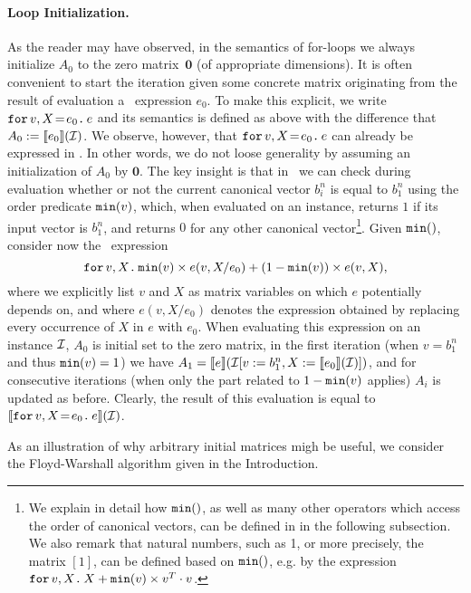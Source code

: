 \paragraph{Loop Initialization.} As the reader may have observed, in the semantics of for-loops we 
always initialize $A_0$ to the zero matrix~$\mathbf{0}$ (of appropriate dimensions). It is often convenient
to start the iteration given some concrete matrix  originating from the result of evaluation a \langfor\ expression $e_0$. To make this explicit, we write $\initf{e_0}{v}{X}{e}$ and its semantics is defined as above
with the difference that $A_0:=\sem{e_0}{\I}$. We observe, however, that $\initf{e_0}{v}{X}{e}$ can already
be expressed in \langfor. In other words, we do not loose generality by assuming an initialization of $A_0$ by $\mathbf{0}$.
The key insight is that in \langfor\ we can check during evaluation whether or not
the current canonical vector $b_i^n$ is equal to $b_1^n$ using the order predicate $\mmin{v}$, which, when evaluated on an instance, returns $1$ if its input vector is $b_1^n$, and returns $0$ for any other canonical vector\footnote{We explain in detail how $\mmin$, as well as many other operators which access the order of canonical vectors, can be defined in \langfor in the following subsection. We also remark that natural numbers, such as 1, or more precisely, the matrix $[1]$, can be defined based on $\mmin$, e.g. by the expression $\ffor{v}{X} X + \mmin{v}\times v^T\cdot v$.}. Given $\mmin$, consider now the
\langfor\ expression
 $$\ffor{v}{X}{\mmin{v}\times e(v,X/e_0) + (1-\mmin{v})\times e(v,X)},$$
 where we explicitly list $v$ and $X$ as matrix variables on which $e$ potentially depends on, and where
 $e(v,X/e_0)$ denotes the expression obtained by replacing every occurrence of $X$ in $e$ with $e_0$.
When evaluating this expression on an instance $\I$, $A_0$ is initial set to the zero matrix, in the first iteration (when  $v=b_1^n$ and thus $\mmin{v}=1$)
we have $A_1=\sem{e}{\I[v:=b_1^n,X:=\sem{e_0}{\I}]}$, and for consecutive iterations (when only the part related to $1-\mmin{v}$ applies) $A_i$ is updated as before. Clearly, the result of this evaluation is equal to
$\sem{\initf{e_0}{v}{X}{e}}{\I}$.


As an illustration of why arbitrary initial matrices migh be useful, we consider the Floyd-Warshall algorithm given in the Introduction. 

